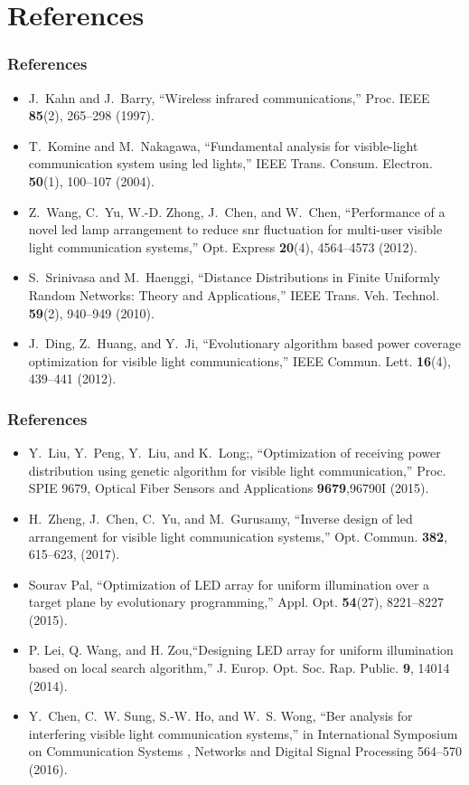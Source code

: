 \documentclass{beamer}
\theoremstyle{remark}
\begin{document}
\section{References}
\begin{frame}
\frametitle{References}
\begin{itemize}
 \vfill
\item
J.~Kahn and J.~Barry, ``Wireless infrared communications,'' Proc. IEEE  \textbf{85}(2), 265--298 (1997).
 \vfill
\item
T.~Komine and M.~Nakagawa, ``Fundamental analysis for visible-light
  communication system using led lights,'' IEEE Trans. Consum. Electron.  \textbf{50}(1), 100--107 (2004).
  \vfill
\item
Z.~Wang, C.~Yu, W.-D. Zhong, J.~Chen, and W.~Chen, ``Performance of a novel led
  lamp arrangement to reduce snr fluctuation for multi-user visible light
  communication systems,'' Opt. Express \textbf{20}(4), 4564--4573 (2012).
 \vfill
\item
S.~Srinivasa and M.~Haenggi, ``Distance {D}istributions in {F}inite {U}niformly
  {R}andom {N}etworks: {T}heory and {A}pplications,'' IEEE Trans. Veh. Technol. \textbf{59}(2), 940--949 (2010).
  \vfill
\item
J.~Ding, Z.~Huang, and Y.~Ji, ``Evolutionary algorithm based power coverage
  optimization for visible light communications,'' IEEE Commun. Lett. \textbf{16}(4), 439--441 (2012).
 \vfill
\end{itemize}
\end{frame}

\begin{frame}
\frametitle{References}
\begin{itemize}
 \vfill
\item
Y.~Liu, Y.~Peng, Y.~Liu, and K.~Long;, ``Optimization of receiving power
  distribution using genetic algorithm for visible light communication,''
  Proc. SPIE 9679, Optical Fiber Sensors and Applications \textbf{9679},96790I (2015).
 \vfill
\item
H.~Zheng, J.~Chen, C.~Yu, and M.~Gurusamy, ``Inverse design of led arrangement
  for visible light communication systems,'' Opt. Commun. \textbf{382}, 615--623, (2017).
  \vfill
\item
Sourav Pal, ``Optimization of LED array for uniform illumination over a target plane by evolutionary programming,'' Appl. Opt. \textbf{54}(27), 8221--8227 (2015). 
 \vfill
\item
  P. Lei, Q. Wang, and H. Zou,``Designing LED array for uniform illumination based on local search algorithm,'' J. Europ. Opt. Soc. Rap. Public. \textbf{9}, 14014 (2014).
   \vfill
\item
Y.~Chen, C.~W. Sung, S.-W. Ho, and W.~S. Wong, ``Ber analysis for interfering
  visible light communication systems,'' in International Symposium on
  Communication Systems , Networks and Digital Signal Processing 564--570 (2016).
 \vfill
\end{itemize}

\end{frame}
\end{document}
